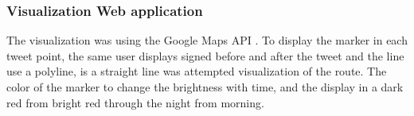 
\subsubsection{Visualization Web application}
The visualization was using the Google Maps API \cite{webpage_googlemapapi}.
To display the marker in each tweet point, the same user displays signed before and after the tweet and the line use a polyline, is a straight line was attempted visualization of the route.
The color of the marker to change the brightness with time, and the display in a dark red from bright red through the night from morning.

